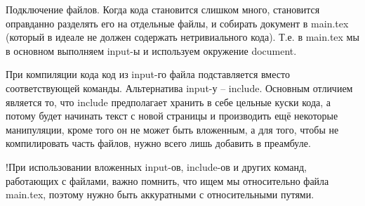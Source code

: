 \documentclass[a4paper, 12pt]{article}
\begin{document}
Подключение файлов. Когда кода становится слишком много, становится оправданно разделять его на отдельные файлы, и собирать документ в main.tex (который в идеале не должен содержать нетривиального кода). Т.е. в main.tex мы в основном выполняем input-ы и используем окружение document. 

При компиляции кода код из input-го файла подставляется вместо соответствующей команды. Альтернатива input-у – include. Основным отличием является то, что include предполагает хранить в себе цельные куски кода, а потому будет начинать текст с новой страницы и производить ещё некоторые манипуляции, кроме того он не может быть вложенным, а для того, чтобы не компилировать часть файлов, нужно всего лишь добавить \verb|| в преамбуле. 

!При использовании вложенных input-ов, include-ов и других команд, работающих с файлами, важно помнить, что ищем мы относительно файла main.tex, поэтому нужно быть аккуратными с относительными путями. 
\end{document}
